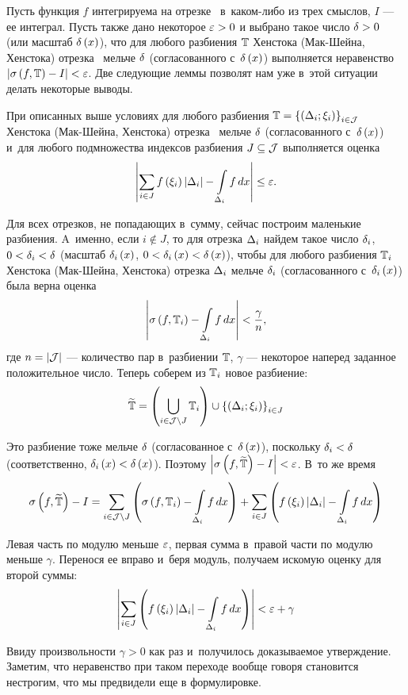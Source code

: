 \documentclass[draft]{article}
\begin{document}
\eject



Пусть функция $f$ интегрируема на отрезке \ab\ в~каком-либо из трех
смыслов, $I$ --- ее интеграл. Пусть также дано некоторое $\varepsilon > 0$ и
выбрано такое число $\delta > 0$ (или масштаб $\dex$), что для любого
разбиения $\mathbb{T}$ Хенстока (Мак-Шейна, Хенстока) отрезка \ab\ мельче
$\delta$ (согласованного с~$\dex$) выполняется неравенство
$\abs{\isfT-I}<\ep$. Две следующие леммы позволят нам уже в~этой
ситуации делать некоторые выводы.

\bigskip


При описанных выше условиях для любого разбиения
$\T = \dixif_{i\in\J}$ Хенстока (Мак-Шейна, Хенстока) отрезка \ab\
мельче $\delta$ (согласованного с~$\dex$) и~для любого подмножества
индексов разбиения $J\subseteq\mathcal{J}$ выполняется оценка
$$\abs{\sum_{i\in J}\fxildi-\intdeifdx}\le\ep.$$

\pr

Для всех отрезков, не попадающих в~сумму, сейчас построим маленькие
разбиения. A~именно, если $i\notin J$, то для отрезка $\Delta_i$ найдем
такое число $\delta_i$, $0 < \delta_i < \delta$ (масштаб $\de_i\atx$,
$0 < \de_i\atx < \dex$), чтобы для любого разбиения $\mathbb{T}_i$
Хенстока (Мак-Шейна, Хенстока) отрезка $\Delta_i$ мельче $\delta_i$
(согласованного с~$\de_i\atx$) была верна оценка
$$\abs{\isum(f,\T_i)-\intdeifdx}<{\gamma\over n},$$
где $n = \left|\mathcal{J}\right|$ --- количество пар в~разбиении $\mathbb{T}$, $\gamma$
--- некоторое наперед заданное положительное число. Теперь соберем
из $\mathbb{T}_i$ новое разбиение:
$$\Tt=\at(\bigcup\limits_{i\in\J\setminus J}   \T_i)\cup\dixif_{i\in J}$$

Это разбиение тоже мельче $\delta$ (согласованное с~$\dex$), поскольку
$\delta_i < \delta$ (соответственно, $\de_i\atx < \dex$). Поэтому
$\abs{\isfTt-I}<\ep$. В~то же время
$$\isfTt-I=  \sum\limits_{i\in\J\setminus
J}\at({\isum(f,\T_i)-\intdeifdx})+ \sum\limits_{i\in
J}\at(\fxildi-\intdeifdx)$$

Левая часть по модулю меньше $\varepsilon$, первая сумма в~правой части по
модулю меньше $\gamma$. Перенося ее вправо и~беря модуль, получаем
искомую оценку для второй суммы:
$$\abs{\sum\limits_{i\in
J}\at(\fxildi-\intdeifdx)}<\ep+\gamma$$

Ввиду произвольности $\gamma > 0$ как раз и~получилось
доказываемое утверждение. Заметим, что неравенство при таком
переходе вообще говоря становится нестрогим, что мы предвидели еще в
формулировке.
\end{document}
